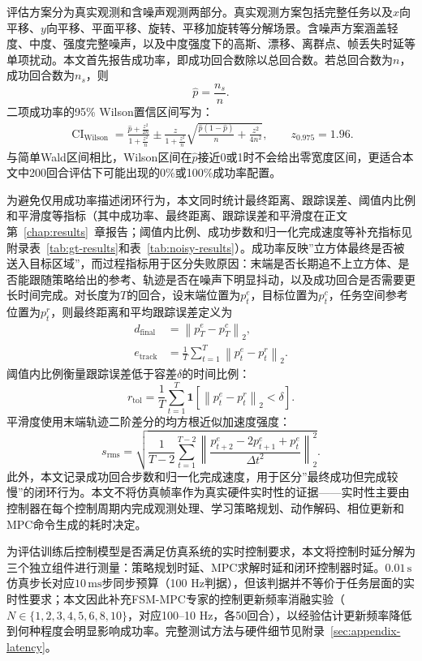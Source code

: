 评估方案分为真实观测和含噪声观测两部分。真实观测方案包括完整任务以及$x$向平移、$y$向平移、平面平移、旋转、平移加旋转等分解场景。含噪声方案涵盖轻度、中度、强度完整噪声，以及中度强度下的高斯、漂移、离群点、帧丢失时延等单项扰动。本文首先报告成功率，即成功回合数除以总回合数。若总回合数为$n$，成功回合数为$n_s$，则
\begin{equation}
    \hat{p}=\frac{n_s}{n}.
    \label{eq:success-rate}
\end{equation}
二项成功率的95\% Wilson置信区间写为\citep{wilson1927probable,brown2001interval}：
\begin{align}
    \operatorname{CI}_{\mathrm{Wilson}}
    =\frac{\hat{p}+\frac{z^2}{2n}}{1+\frac{z^2}{n}}
    \pm
    \frac{z}{1+\frac{z^2}{n}}
    \sqrt{\frac{\hat{p}(1-\hat{p})}{n}+\frac{z^2}{4n^2}},\qquad z_{0.975}=1.96.
    \label{eq:wilson-ci}
\end{align}
与简单Wald区间相比，Wilson区间在$\hat{p}$接近0或1时不会给出零宽度区间，更适合本文中200回合评估下可能出现的0\%或100\%成功率配置\citep{brown2001interval}。

为避免仅用成功率描述闭环行为，本文同时统计最终距离、跟踪误差、阈值内比例和平滑度等指标（其中成功率、最终距离、跟踪误差和平滑度在正文第~\ref{chap:results}~章报告；阈值内比例、成功步数和归一化完成速度等补充指标见附录表~\ref{tab:gt-results}和表~\ref{tab:noisy-results}）。成功率反映”立方体最终是否被送入目标区域”，而过程指标用于区分失败原因：末端是否长期追不上立方体、是否能跟随策略给出的参考、轨迹是否在噪声下明显抖动，以及成功回合是否需要更长时间完成。对长度为$T$的回合，设末端位置为$p^e_t$，目标位置为$p^c_t$，任务空间参考位置为$p^r_t$，则最终距离和平均跟踪误差定义为
\begin{align}
    d_{\mathrm{final}} &= \left\|p^e_T-p^c_T\right\|_2, \\
    e_{\mathrm{track}} &= \frac{1}{T}\sum_{t=1}^{T}\left\|p^e_t-p^r_t\right\|_2.
    \label{eq:distance-tracking-metrics}
\end{align}
阈值内比例衡量跟踪误差低于容差$\delta$的时间比例：
\begin{equation}
    r_{\mathrm{tol}}=\frac{1}{T}\sum_{t=1}^{T}\mathbf{1}\left[\left\|p^e_t-p^r_t\right\|_2<\delta\right].
    \label{eq:within-tolerance}
\end{equation}
平滑度使用末端轨迹二阶差分的均方根近似加速度强度：
\begin{equation}
    s_{\mathrm{rms}}
    =\sqrt{\frac{1}{T-2}\sum_{t=1}^{T-2}
    \left\|\frac{p^e_{t+2}-2p^e_{t+1}+p^e_t}{\Delta t^2}\right\|_2^2}.
    \label{eq:smoothness-metric}
\end{equation}
此外，本文记录成功回合步数和归一化完成速度，用于区分”最终成功但完成较慢”的闭环行为。本文不将仿真帧率作为真实硬件实时性的证据——实时性主要由控制器在每个控制周期内完成观测处理、学习策略规划、动作解码、相位更新和MPC命令生成的耗时决定。

为评估训练后控制模型是否满足仿真系统的实时控制要求，本文将控制时延分解为三个独立组件进行测量：策略规划时延、MPC求解时延和闭环控制器时延。$0.01\,\mathrm{s}$仿真步长对应$10\,\mathrm{ms}$步同步预算（100 Hz判据），但该判据并不等价于任务层面的实时性要求；本文因此补充FSM-MPC专家的控制更新频率消融实验（$N\in\{1,2,3,4,5,6,8,10\}$，对应100--10 Hz，各50回合），以经验估计更新频率降低到何种程度会明显影响成功率。完整测试方法与硬件细节见附录~\ref{sec:appendix-latency}。
